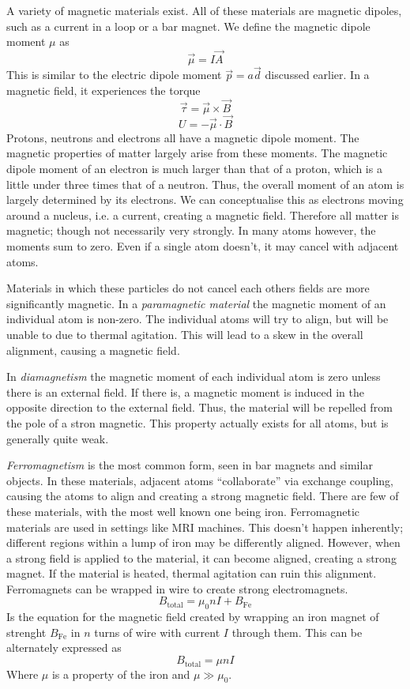 \documentclass[12pt]{report}
\begin{document}
\begin{flushleft}
A variety of magnetic materials exist. All of these materials are magnetic
dipoles, such as a current in a loop or a bar magnet. We define the magnetic
dipole moment \(\mu\) as
\[\vec{\mu} = I\vec{A}\]
This is similar to the electric dipole moment \(\vec{p} = a\vec{d}\) discussed
earlier. In a magnetic field, it experiences the torque
\[\vec{\tau} = \vec{\mu}\times\vec{B}\]
\[U = -\vec{\mu}\cdot\vec{B}\]
Protons, neutrons and electrons all have a magnetic dipole moment. The magnetic
properties of matter largely arise from these moments. The magnetic dipole
moment of an electron is much larger than that of a proton, which is a little
under three times that of a neutron. Thus, the overall moment of an atom is
largely determined by its electrons. We can conceptualise this as electrons
moving around a nucleus, i.e. a current, creating a magnetic field. Therefore
all matter is magnetic; though not necessarily very strongly. In many atoms
however, the moments sum to zero. Even if a single atom doesn't, it may cancel
with adjacent atoms. \par
Materials in which these particles do not cancel each others fields are more
significantly magnetic. In a \textit{paramagnetic material} the magnetic moment
of an individual atom is non-zero. The individual atoms will try to align, but
will be unable to due to thermal agitation. This will lead to a skew in the
overall alignment, causing a magnetic field. \par
In \textit{diamagnetism} the magnetic moment of each individual atom is zero
unless there is an external field. If there is, a magnetic moment is induced
in the opposite direction to the external field. Thus, the material will be
repelled from the pole of a stron magnetic. This property actually exists for
all atoms, but is generally quite weak. \par
\textit{Ferromagnetism} is the most common form, seen in bar magnets and
similar objects. In these materials, adjacent atoms ``collaborate'' via
exchange coupling, causing the atoms to align and creating a strong magnetic
field. There are few of these materials, with the most well known one being
iron. Ferromagnetic materials are used in settings like MRI machines. This
doesn't happen inherently; different regions within a lump of iron may be
differently aligned. However, when a strong field is applied to the material,
it can become aligned, creating a strong magnet. If the material is heated,
thermal agitation can ruin this alignment. Ferromagnets can be wrapped in
wire to create strong electromagnets.
\[B_\mathrm{total} = \mu_0nI + B_\mathrm{Fe}\]
Is the equation for the magnetic field created by wrapping an iron magnet of
strenght \(B_\mathrm{Fe}\) in \(n\) turns of wire with current \(I\) through
them. This can be alternately expressed as
\[B_\mathrm{total} = \mu nI\]
Where \(\mu\) is a property of the iron and \(\mu \gg \mu_0\). 


\end{flushleft}
\end{document}

